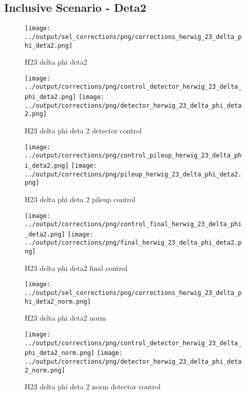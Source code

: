 \documentclass[11pt]{book}
\begin{document}
\clearpage
\subsection{Inclusive Scenario - Deta2}
\begin{figure}[ht]
\centering
\texttt{[image: ../output/sel\_corrections/png/corrections\_herwig\_23\_delta\_phi\_deta2.png]}
\caption{H23 delta phi deta2}
\label{fig:H23_delta_phi_deta2}
\end{figure}

\begin{figure}[ht]
\centering
\texttt{[image: ../output/corrections/png/control\_detector\_herwig\_23\_delta\_phi\_deta2.png]}
\texttt{[image: ../output/corrections/png/detector\_herwig\_23\_delta\_phi\_deta2.png]}
\caption{H23 delta phi deta 2 detector control}
\label{fig:H23_delta_phi_deta2_detector_control}
\end{figure}

\begin{figure}[ht]
\centering
\texttt{[image: ../output/corrections/png/control\_pileup\_herwig\_23\_delta\_phi\_deta2.png]}
\texttt{[image: ../output/corrections/png/pileup\_herwig\_23\_delta\_phi\_deta2.png]}
\caption{H23 delta phi deta 2 pileup control}
\label{fig:H23_delta_phi_deta2_pileup_control}
\end{figure}


\begin{figure}[ht]
\centering
\texttt{[image: ../output/corrections/png/control\_final\_herwig\_23\_delta\_phi\_deta2.png]}
\texttt{[image: ../output/corrections/png/final\_herwig\_23\_delta\_phi\_deta2.png]}
\caption{H23 delta phi deta2 final control}
\label{fig:H23_delta_phi_deta2_final_control}
\end{figure}

\begin{figure}[ht]
\centering
\texttt{[image: ../output/sel\_corrections/png/corrections\_herwig\_23\_delta\_phi\_deta2\_norm.png]}
\caption{H23 delta phi deta2 norm}
\label{fig:H23_delta_phi_deta2_norm}
\end{figure}


\begin{figure}[ht]
\centering
\texttt{[image: ../output/corrections/png/control\_detector\_herwig\_23\_delta\_phi\_deta2\_norm.png]}
\texttt{[image: ../output/corrections/png/detector\_herwig\_23\_delta\_phi\_deta2\_norm.png]}
\caption{H23 delta phi deta 2 norm detector control}
\label{fig:H23_delta_phi_deta2_norm_detector_control}
\end{figure}
\end{document}
